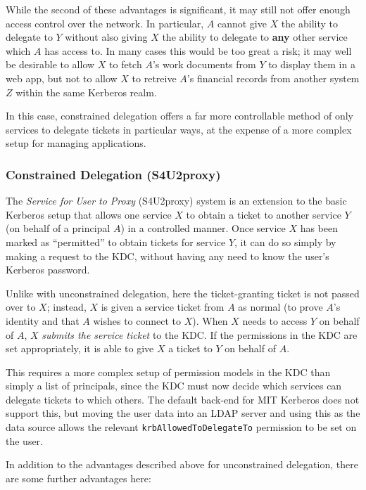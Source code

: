 \documentclass{article}
\begin{document}

While the second of these advantages is significant, it may still not offer enough access control over the network. In particular, $A$ cannot give $X$ the ability to delegate to $Y$ without also giving $X$ the ability to delegate to \textbf{any} other service which $A$ has access to. In many cases this would be too great a risk; it may well be desirable to allow $X$ to fetch $A$'s work documents from $Y$ to display them in a web app, but not to allow $X$ to retreive $A$'s financial records from another system $Z$ within the same Kerberos realm.

In this case, constrained delegation offers a far more controllable method of only services to delegate tickets in particular ways, at the expense of a more complex setup for managing applications.

\subsubsection{Constrained Delegation (S4U2proxy)}
The \textit{Service for User to Proxy} (S4U2proxy) system is an extension to the basic Kerberos setup that allows one service $X$ to obtain a ticket to another service $Y$ (on behalf of a principal $A$) in a controlled manner. Once service $X$ has been marked as ``permitted'' to obtain tickets for service $Y$, it can do so simply by making a request to the KDC, without having any need to know the user's Kerberos password\cite{MS-s4u2}.

Unlike with unconstrained delegation, here the ticket-granting ticket is not passed over to $X$; instead, $X$ is given a service ticket from $A$ as normal (to prove $A$'s identity and that $A$ wishes to connect to $X$). When $X$ needs to access $Y$ on behalf of $A$, $X$ \textit{submits the service ticket} to the KDC. If the permissions in the KDC are set appropriately, it is able to give $X$ a ticket to $Y$ on behalf of $A$.

This requires a more complex setup of permission models in the KDC than simply a list of principals, since the KDC must now decide which services can delegate tickets to which others. The default back-end for MIT Kerberos does not support this, but moving the user data into an LDAP server and using this as the data source allows the relevant \texttt{krbAllowedToDelegateTo} permission to be set on the user\cite{KRB-DELEG}.

In addition to the advantages described above for unconstrained delegation, there are some further advantages here:
\end{document}

